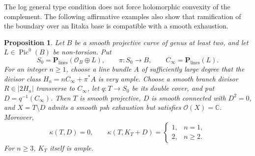 \documentclass[11pt]{amsart}
\newtheorem{proposition}[theorem]{Proposition}
\theoremstyle{definition}
\theoremstyle{remark}
\numberwithin{equation}{section}
\newcommand{\C}{\mathbb C}
\newcommand{\PP}{\mathbf P}
\newcommand{\OO}{\mathcal O}
\begin{document}
The log general type condition does not force holomorphic convexity of
the complement.  The following affirmative examples also show that
ramification of the boundary over an Iitaka base is compatible with a
smooth exhaustion.

\begin{proposition}\label{prop:surface-branched-flat-examples}
Let $B$ be a smooth projective curve of genus at least two, and let
$L\in\operatorname{Pic}^0(B)$ be non-torsion.  Put
\[
 S_0=\PP_{\mathrm{lines}}(\OO_B\oplus L),\qquad
 \pi:S_0\to B,\qquad C_\infty=\PP_{\mathrm{lines}}(L).
\]
For an integer $n\ge1$, choose a line bundle $A$ of sufficiently large
degree that the divisor class
$H_n=nC_\infty+\pi^*A$ is very ample.  Choose a smooth branch divisor
$R\in|2H_n|$ transverse to $C_\infty$, let $q:T\to S_0$ be its double
cover, and put $D=q^{-1}(C_\infty)$.  Then $T$ is smooth projective,
$D$ is smooth connected with $D^2=0$, and $X=T\setminus D$ admits a
smooth psh exhaustion but satisfies $\OO(X)=\C$.  Moreover,
\[
 \kappa(T,D)=0,\qquad
 \kappa(T,K_T+D)=
 \begin{cases}1,&n=1,\\2,&n\ge2.\end{cases}
\]
For $n\ge3$, $K_T$ itself is ample.
\end{proposition}
\end{document}
